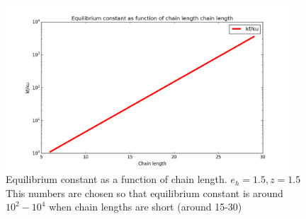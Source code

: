 \documentclass[12pt]{paper}
\begin{document}
\begin{figure}[h!]
  \centering
  \includegraphics[width=0.95\textwidth]{pictures/K.png} 
  \caption{Equilibrium constant as a function of chain length. $e_h=1.5,z=1.5$ This numbers are 
chosen so that equilibrium constant is around 
$10^2-10^4$ when chain lengths are short (around 15-30)}
  \label{fig:k_unf_N}
\end{figure}

  
  
\end{document}
